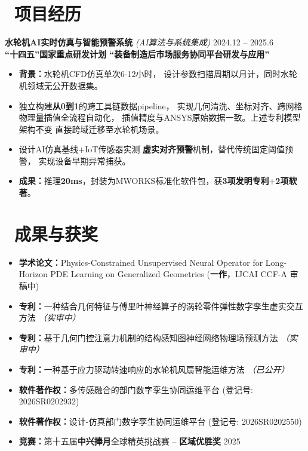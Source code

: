 \documentclass[11pt]{article}
\begin{document}
\section{\makebox[\widthof{\faBriefcase}][c]{\color{CVBlue}%
\faBriefcase}\ 项目经历}

\textbf{水轮机AI实时仿真与智能预警系统} 
\textit{(AI算法与系统集成)} \hfill 2024.12 -- 2025.6\\[0.2em]
\textcolor{CVBlue}{\textbf{``十四五''国家重点研发计划
``装备制造后市场服务协同平台研发与应用''}}
\begin{itemize}
    \item \textbf{背景：}水轮机CFD仿真单次6-12小时，
    设计参数扫描周期以月计，同时水轮机领域无公开数据集。
    
    \item 独立构建\textbf{从0到1}的跨工具链数据pipeline，
    实现几何清洗、坐标对齐、跨网格物理量插值全流程自动化，
    插值精度与ANSYS原始数据一致。上述专利模型架构不变
    直接跨域迁移至水轮机场景。
    
    \item 设计AI仿真基线+IoT传感器实测
    \textbf{虚实对齐预警}机制，替代传统固定阈值预警，
    实现设备早期异常捕获。
    
    \item \textbf{成果：}推理\textbf{20ms}，封装为MWORKS标准化软件包，获\textbf{3项发明专利}+\textbf{2项软著}。
\end{itemize}



\section{%
    \makebox[\widthof{\faTrophy}][c]%
    {\color{CVBlue}\faTrophy}\ 成果与获奖%
}

\begin{itemize}
    \item \textbf{学术论文：}Physics-Constrained Unsupervised Neural Operator for Long-Horizon PDE Learning on Generalized Geometries (\textbf{一作}，IJCAI CCF-A 审稿中)
    \item \textbf{专利：}一种结合几何特征与傅里叶神经算子的涡轮零件弹性数字孪生虚实交互方法 \textit{（实审中）}
    \item \textbf{专利：}基于几何门控注意力机制的结构感知图神经网络物理场预测方法 \textit{（实审中）}
    \item \textbf{专利：}一种基于应力驱动转速响应的水轮机风扇智能运维方法 \textit{（已公开）}
    \item \textbf{软件著作权：}多传感融合的部门数字孪生协同运维平台 (登记号: 2026SR0202932)
    \item \textbf{软件著作权：}设计-仿真部门数字孪生协同运维平台 (登记号: 2026SR0202550)
    \item \textbf{竞赛：}第十五届\textbf{中兴捧月}全球精英挑战赛 -- \textbf{区域优胜奖} \hfill 2025
\end{itemize}
\end{document}
